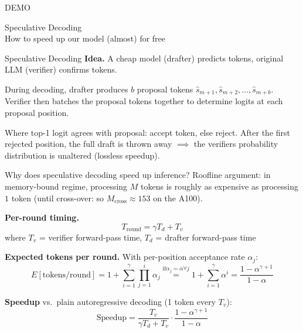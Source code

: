 \documentclass[aspectratio=169, 11pt]{beamer}
\begin{document}
\begin{frame}[standout]
  DEMO
\end{frame}

\begin{frame}[standout]
  Speculative Decoding \\ \small How to speed up our model (almost) for free
\end{frame}

\begin{frame}{Speculative Decoding}
  \textbf{Idea.} A cheap model (drafter) predicts tokens, original LLM (verifier) confirms tokens. 

  During decoding, drafter produces $b$ proposal tokens $\hat{s}_{m+1}, \hat{s}_{m+2}, \ldots, \hat{s}_{m+b}$. 
  Verifier then batches the proposal tokens together to determine logits at each proposal position.

  Where top-1 logit agrees with proposal: accept token, else reject. After the first rejected position, 
  the full draft is thrown away 
  $\implies$ the verifiers probability distribution is unaltered (lossless speedup).

\end{frame}

\begin{frame}{Why does speculative decoding speed up inference?}
  Roofline argument: in memory-bound regime, processing $M$ tokens is roughly as expensive as processing $1$ token
  {\color{gray}(until cross-over: so $M_{\text{cross}} \approx 153$ on the A100)}.

\textbf{Per-round timing.}
\[
  T_{\text{round}} = \gamma T_d + T_v
\]
where $T_v$ = verifier forward-pass time, $T_d$ = drafter forward-pass time

\textbf{Expected tokens per round.} With per-position acceptance rate $\alpha_j$: 
$$E[\text{tokens/round}] = 1 + \sum_{i=1}^\gamma \prod_{j=1}^i \alpha_j \stackrel{\text{if} \alpha_j = \alpha \forall j}{=} 1 + \sum_{i=1}^\gamma \alpha^i = \frac{1-\alpha^{\gamma+1}}{1-\alpha}$$

\textbf{Speedup} vs.\ plain autoregressive decoding (1 token every $T_v$):
\[
  \boxed{\text{Speedup} = \frac{T_v}{\gamma T_d + T_v}\cdot\frac{1-\alpha^{\gamma+1}}{1-\alpha}}
\]
\end{frame}
\end{document}

